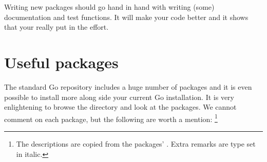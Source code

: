 \begin{lbar}
Writing new packages should go hand in hand with writing (some)
documentation and test functions. It will make your code better and it
shows that your really put in the effort.
\end{lbar}

\section{Useful packages}
The standard Go repository includes a huge number of packages and it is
even possible to install more along side your current Go installation. 
It is very enlightening to browse the  directory and
look at the packages.
We cannot comment on each package, but the following are worth a mention:
\footnote{The descriptions are copied from the packages' . Extra
remarks are type set in italic.}

